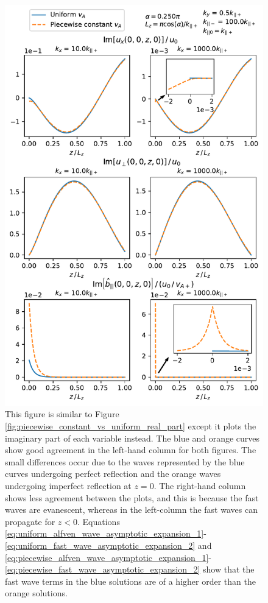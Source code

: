 \begin{figure}
    \centering
    \vspace{-20pt}
    \includegraphics[width=\textwidth,height=0.8\textheight,keepaspectratio]{figures/chapter04/piecewise_constant_vs_uniform_imag_part.pdf}
    \vspace{-10pt}
    \caption{This figure is similar to Figure \ref{fig:piecewise_constant_vs_uniform_real_part} except it plots the imaginary part of each variable instead. The blue and orange curves show good agreement in the left-hand column for both figures. The small differences occur due to the waves represented by the blue curves undergoing perfect reflection and the orange waves undergoing imperfect reflection at $z=0$. The right-hand column shows less agreement between the plots, and this is because the fast waves are evanescent, whereas in the left-column the fast waves can propagate for $z<0$. Equations  \eqref{eq:uniform_alfven_wave_asymptotic_expansion_1}-\eqref{eq:uniform_fast_wave_asymptotic_expansion_2} and \eqref{eq:piecewise_alfven_wave_asymptotic_expansion_1}-\eqref{eq:piecewise_fast_wave_asymptotic_expansion_2} show that the fast wave terms in the blue solutions are of a higher order than the orange solutions.}
    \label{fig:piecewise_constant_vs_uniform_imag_part}
    \vspace{-20pt}
\end{figure}

